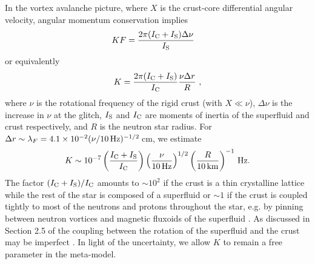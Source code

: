 In the vortex avalanche picture, where $X$ is the crust-core differential angular velocity, angular momentum conservation implies \citep{Melatos2015, Fulgenzi2017}
\begin{align}
KF &= \frac{2\pi(I_{\rm C} + I_{\rm S}) \Delta \nu}{I_{\rm S}} \label{eq:hda_kf}
\end{align}
or equivalently
\begin{align}
K = \frac{2\pi(I_{\rm C} + I_{\rm S})}{I_{\rm C}} \frac{\nu\Delta r}{R} \ , \label{eq:hda_kr}
\end{align}
where $\nu$ is the rotational frequency of the rigid crust (with $X \ll \nu$), $\Delta \nu$ is the increase in $\nu$ at the glitch, $I_{\rm S}$ and $I_{\rm C}$ are moments of inertia of the superfluid and crust respectively, and $R$ is the neutron star radius. For $\Delta r \sim \lambda_F = \num{4.1e-2} (\nu/10\,{\rm Hz})^{-1/2}\,$cm, we estimate 
\begin{align}
K \sim 10^{-7} \left(\frac{I_{\rm C} + I_{\rm S}}{I_{\rm C}}\right)\left(\frac{\nu}{10\,{\rm Hz}}\right)^{1/2} \left(\frac{R}{10\,{\rm km}}\right)^{-1}\, {\rm Hz}.
\end{align}
The factor $(I_{\rm C} + I_{\rm S}) / I_{\rm C}$ amounts to $\sim10^{2}$ if the crust is a thin crystalline lattice while the rest of the star is composed of a superfluid \citep{Andersson2012, Hooker2015} or $\sim 1$ if the crust is coupled tightly to most of the neutrons and protons throughout the star, e.g. by pinning between neutron vortices and magnetic fluxoids of the superfluid \citep{Srinivasan1990, Link1999a, Lyne2000a, Espinoza2011}. As discussed in Section 2.5 of \citet{Carlin2020bsa} the coupling between the rotation of the superfluid and the crust may be imperfect \citep{Pizzochero2020}. In light of the uncertainty, we allow $K$ to remain a free parameter in the meta-model.

